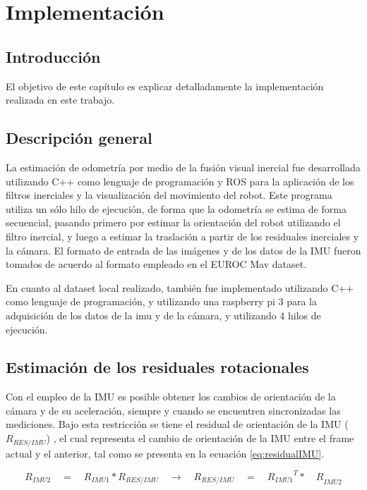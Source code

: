 \chapter{Implementación}
\label{capitulo5}


\section{Introducción}
El objetivo de este capítulo es explicar detalladamente la implementación realizada en este trabajo.
\clearpage



\section{Descripción general}\label{seccion-corte}

La estimación de odometría por medio de la fusión visual inercial fue desarrollada utilizando C++ como lenguaje de programación y ROS para la aplicación de los filtros inerciales y la visualización del movimiento del robot. Este programa utiliza un sólo hilo de ejecución, de forma que la odometría se estima de forma secuencial, pasando primero por estimar la orientación del robot utilizando el filtro inercial, y luego a estimar la traslación a partir de los residuales inerciales y la cámara. El formato de entrada de las imágenes y de los datos de la IMU fueron tomados de acuerdo al formato empleado en el EUROC Mav dataset.

En cuanto al dataset local realizado, también fue implementado utilizando C++ como lenguaje de programación, y utilizando una raspberry pi 3 para la adquisición de los datos de la imu y de la cámara, y utilizando 4 hilos de ejecución.


\section{Estimación de los residuales rotacionales}

Con el empleo de la IMU es posible obtener los cambios de orientación de la cámara y de su aceleración, siempre y cuando se encuentren sincronizadas las mediciones. Bajo esta restricción se tiene el residual de orientación de la IMU (${R}_{RES/IMU}$) , el cual representa el cambio de orientación de la IMU entre el frame actual y el anterior, tal como se presenta en la ecuación \ref{eq:residualIMU}.


\begin{equation}
{ R }_{ IMU2 }\quad =\quad { R }_{ IMU1 }*{ R }_{ RES/IMU }\quad \rightarrow \quad { R }_{ RES/IMU }\quad =\quad { { { R }_{ IMU1 } }^{ T }*\quad R }_{ IMU2 }
\label{eq:residualIMU} 
\end{equation}

